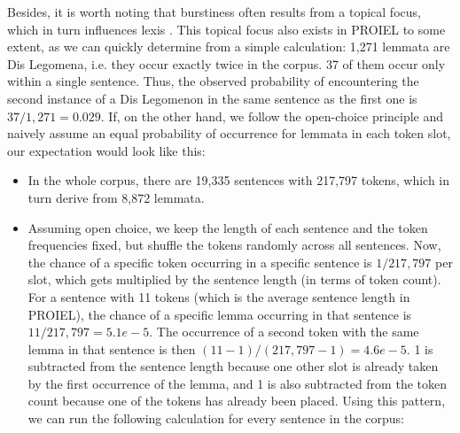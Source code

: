 Besides, it is worth noting that burstiness often results from a topical focus, which in turn influences lexis \parencite[99]{pierrehumbertBurstinessVerbsDerived2012}. This topical focus also exists in PROIEL to some extent, as we can quickly determine from a simple calculation: 1,271 lemmata are Dis Legomena, i.e. they occur exactly twice in the corpus. 37 of them occur only within a single sentence. Thus, the observed probability of encountering the second instance of a Dis Legomenon in the same sentence as the first one is $37 / 1,271 = 0.029$. If, on the other hand, we follow the open-choice principle \parencite[109f.]{sinclairCorpusConcordanceCollocation1991} and naively assume an equal probability of occurrence for lemmata in each token slot, our expectation would look like this:
\begin{itemize}
	\item In the whole corpus, there are 19,335 sentences with 217,797 tokens, which in turn derive from 8,872 lemmata.
	\item Assuming open choice, we keep the length of each sentence and the token frequencies fixed, but shuffle the tokens randomly across all sentences. Now, the chance of a specific token occurring in a specific sentence is $1 / 217,797$ per slot, which gets multiplied by the sentence length (in terms of token count). For a sentence with 11 tokens (which is the average sentence length in PROIEL), the chance of a specific lemma occurring in that sentence is $11 / 217,797 = 5.1e-5$. The occurrence of a second token with the same lemma in that sentence is then $(11 - 1) / (217,797 - 1) = 4.6e-5$. 1 is subtracted from the sentence length because one other slot is already taken by the first occurrence of the lemma, and 1 is also subtracted from the token count because one of the tokens has already been placed. Using this pattern, we can run the following calculation for every sentence in the corpus:
	

\end{itemize}
